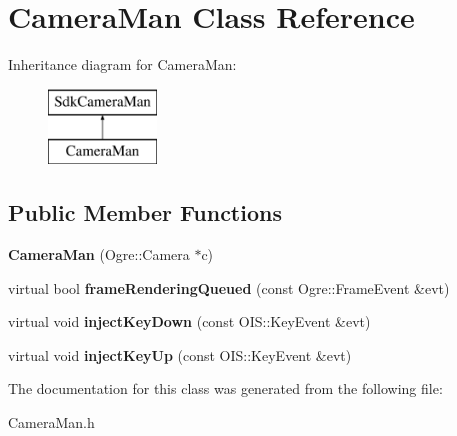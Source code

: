 \hypertarget{classCameraMan}{\section{Camera\-Man Class Reference}
\label{classCameraMan}
}
Inheritance diagram for Camera\-Man\-:\begin{figure}[H]
\begin{center}
\leavevmode
\includegraphics[height=2.000000cm]{classCameraMan}
\end{center}
\end{figure}
\subsection*{Public Member Functions}
\begin{DoxyCompactItemize}
\item 
\hypertarget{classCameraMan_a2336426531ac8a981c0428a920b2c68f}{{\bfseries Camera\-Man} (Ogre\-::\-Camera $\ast$c)}\label{classCameraMan_a2336426531ac8a981c0428a920b2c68f}

\item 
\hypertarget{classCameraMan_acd92199c17947de1a1fc2ac8212fd7ec}{virtual bool {\bfseries frame\-Rendering\-Queued} (const Ogre\-::\-Frame\-Event \&evt)}\label{classCameraMan_acd92199c17947de1a1fc2ac8212fd7ec}

\item 
\hypertarget{classCameraMan_af07ab2df48c7f19df495f5c91ad67d19}{virtual void {\bfseries inject\-Key\-Down} (const O\-I\-S\-::\-Key\-Event \&evt)}\label{classCameraMan_af07ab2df48c7f19df495f5c91ad67d19}

\item 
\hypertarget{classCameraMan_aa77267e520d2a0465368a2b13cdd72e2}{virtual void {\bfseries inject\-Key\-Up} (const O\-I\-S\-::\-Key\-Event \&evt)}\label{classCameraMan_aa77267e520d2a0465368a2b13cdd72e2}

\end{DoxyCompactItemize}


The documentation for this class was generated from the following file\-:\begin{DoxyCompactItemize}
\item 
Camera\-Man.\-h\end{DoxyCompactItemize}

